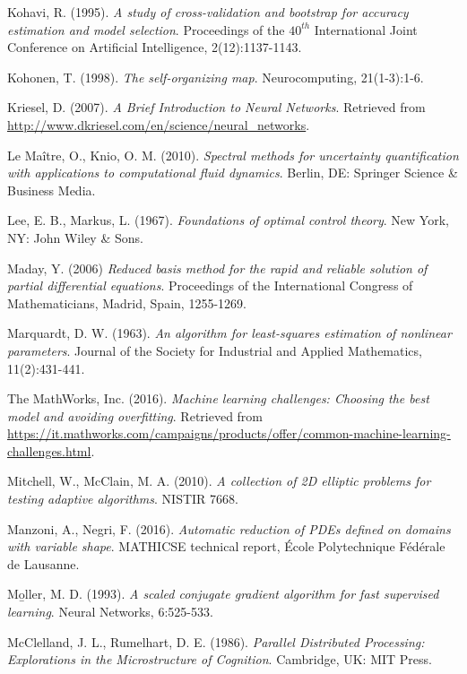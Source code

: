\documentclass[12pt, a4paper, twoside, openright, notitlepage]{report}
\numberwithin{equation}{chapter}
\theoremstyle{theorem}
\theoremstyle{definition}
\theoremstyle{remark}
\theoremstyle{proposition}
\numberwithin{figure}{chapter}
\begin{document}
\begin{thebibliography}{50}
		Kohavi, R. (1995). \emph{A study of cross-validation and bootstrap for accuracy estimation and model selection}. Proceedings of the $40^{th}$ International Joint Conference on Artificial Intelligence, 2(12):1137-1143.
		
		Kohonen, T. (1998). \emph{The self-organizing map}. Neurocomputing, 21(1-3):1-6.
		
		Kriesel, D. (2007). \emph{A Brief Introduction to Neural Networks}. Retrieved from \url{http://www.dkriesel.com/en/science/neural_networks}.
		
		Le Ma\^{i}tre, O., Knio, O. M. (2010). \emph{Spectral methods for uncertainty quantification with applications to computational fluid dynamics}. Berlin, DE: Springer Science \& Business Media.
		
		Lee, E. B., Markus, L. (1967). \emph{Foundations of optimal control theory}. New York, NY: John Wiley \& Sons.
		
		Maday, Y. (2006) \emph{Reduced basis method for the rapid and reliable solution of partial differential equations}. Proceedings of the International Congress of Mathematicians, Madrid, Spain, 1255-1269.
		
		Marquardt, D. W. (1963). \emph{An algorithm for least-squares estimation of nonlinear parameters}. Journal of the Society for Industrial and Applied Mathematics, 11(2):431-441.
		
		The MathWorks, Inc. (2016). \emph{Machine learning challenges: Choosing the best model and avoiding overfitting}. Retrieved from \url{https://it.mathworks.com/campaigns/products/offer/common-machine-learning-challenges.html}.
		
		Mitchell, W., McClain, M. A. (2010). \emph{A collection of 2D elliptic problems for testing adaptive algorithms}. NISTIR 7668.
		
		Manzoni, A., Negri, F. (2016). \emph{Automatic reduction of PDEs defined on domains with variable shape}. MATHICSE technical report, \'Ecole Polytechnique F\'ed\'erale de Lausanne.
		
		M\b{o}ller, M. D. (1993). \emph{A scaled conjugate gradient algorithm for fast supervised learning}. Neural Networks, 6:525-533.
						
		McClelland, J. L., Rumelhart, D. E. (1986). \emph{Parallel Distributed Processing: Explorations in the Microstructure of Cognition}. Cambridge, UK: MIT Press.
		

\end{thebibliography}
\end{document}
